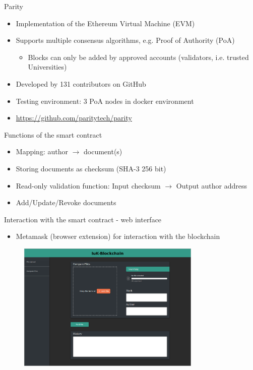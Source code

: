 \documentclass[10pt]{beamer}
\begin{document}
\begin{frame}{Parity}
	\begin{itemize}
		\item Implementation of the Ethereum Virtual Machine (EVM)
		\item Supports multiple consensus algorithms, e.g. Proof of Authority (PoA)
		\begin{itemize}
			\item Blocks can only be added by approved accounts (validators, i.e. trusted Universities)
		\end{itemize}
		\item Developed by 131 contributors on GitHub
		\item Testing environment: 3 PoA nodes in docker environment
		\item \url{https://github.com/paritytech/parity}
	\end{itemize}
\end{frame}

\begin{frame}{Functions of the smart contract}
	\begin{itemize}
		\item Mapping: author  $\rightarrow$ document(s)
		\item Storing documents as checksum (SHA-3 256 bit)
		\item Read-only validation function: Input checksum $\rightarrow$ Output author address
		\item Add/Update/Revoke documents
	\end{itemize}
\end{frame}

\begin{frame}{Interaction with the smart contract - web interface}
	\begin{itemize}
		\item Metamask (browser extension) for interaction with the blockchain
	\end{itemize}
	\begin{figure}
		\includegraphics[width=0.78\textwidth]{images/GUI-180603_1.png}
	\end{figure}
\end{frame}
\end{document}
